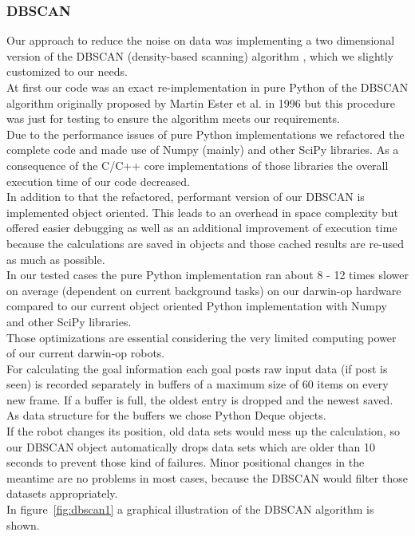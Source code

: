 \documentclass[lnicst,a4paper]{svmultln}
\begin{document}
\subsubsection{DBSCAN} Our approach to reduce the noise on data was implementing a two dimensional version of the DBSCAN (density-based scanning) algorithm \cite{ester:kriegel}, which we slightly customized to our needs.
\\
At first our code was an exact re-implementation in pure Python of the DBSCAN algorithm \cite{ester:kriegel}
originally proposed by Martin Ester et al. in 1996 but this procedure was just for testing to ensure the algorithm meets our requirements.
\\
Due to the performance issues of pure Python implementations we refactored the complete code and made use of Numpy (mainly) and other SciPy libraries. As a consequence of the C/C++ core implementations of those libraries the overall execution time of our code decreased.
\\
In addition to that the refactored, performant version of our DBSCAN is implemented object oriented. This leads to an overhead in space complexity but offered easier debugging as well as an additional improvement of execution time because the calculations are saved in objects and those cached results are re-used as much as possible.
\\
In our tested cases the pure Python implementation ran about 8 - 12 times slower on average (dependent on current background tasks) on our darwin-op hardware compared to our current object oriented Python implementation with Numpy and other SciPy libraries.
\\
Those optimizations are essential considering the very limited computing power of our current darwin-op robots.
\\
For calculating the goal information each goal posts raw input data (if post is seen) is recorded separately in buffers of a maximum size of 60 items on every new frame. If a buffer is full, the oldest entry is dropped and the newest saved. As data structure for the buffers we chose Python Deque objects.
\\
If the robot changes its position, old data sets would mess up the calculation, so our DBSCAN object automatically drops data sets which are older than 10 seconds to prevent those kind of failures. Minor positional changes in the meantime are no problems in most cases, because the DBSCAN would filter those datasets appropriately.
\\
In figure~\ref{fig:dbscan1} a graphical illustration of the DBSCAN algorithm
is shown.
\end{document}
